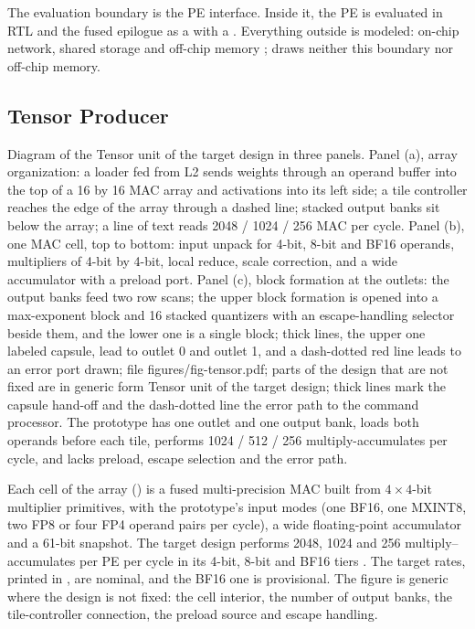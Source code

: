 %
The evaluation boundary is the PE interface.
Inside it, the PE is evaluated in RTL and the fused epilogue as a \evSlice with a \evModel.
Everything outside is modeled: on-chip network, shared storage and off-chip memory
;
 draws neither this boundary nor off-chip memory.

\subsection{Tensor Producer}\label{sec:producer}

%
  {Diagram of the Tensor unit of the target design in three panels. Panel (a), array organization: a loader fed from L2 sends weights through an operand buffer into the top of a 16 by 16 MAC array and activations into its left side; a tile controller reaches the edge of the array through a dashed line; stacked output banks sit below the array; a line of text reads 2048 / 1024 / 256 MAC per cycle. Panel (b), one MAC cell, top to bottom: input unpack for 4-bit, 8-bit and BF16 operands, multipliers of 4-bit by 4-bit, local reduce, scale correction, and a wide accumulator with a preload port. Panel (c), block formation at the outlets: the output banks feed two row scans; the upper block formation is opened into a max-exponent block and 16 stacked quantizers with an escape-handling selector beside them, and the lower one is a single block; thick lines, the upper one labeled capsule, lead to outlet 0 and outlet 1, and a dash-dotted red line leads to an error port}%
  {drawn; file figures/fig-tensor.pdf; parts of the design that are not fixed are in generic form}%
  {Tensor unit of the target design; thick lines mark the capsule hand-off and the dash-dotted line the error path to the command processor. The prototype has one outlet and one output bank, loads both operands before each tile, performs 1024 / 512 / 256 multiply-accumulates per cycle, and lacks preload, escape selection and the error path.}

%
Each cell of the array () is a fused multi-precision MAC built from $4\times4$-bit multiplier primitives, with the prototype's input modes (one BF16, one MXINT8, two FP8 or four FP4 operand pairs per cycle), a wide floating-point accumulator and a 61-bit snapshot.
The target design performs 2048, 1024 and 256 multiply--accumulates per PE per cycle in its 4-bit, 8-bit and BF16 tiers
.
The target rates, printed in , are nominal, and the BF16 one is provisional.
The figure is generic where the design is not fixed: the cell interior, the number of output banks, the tile-controller connection, the preload source and escape handling.

